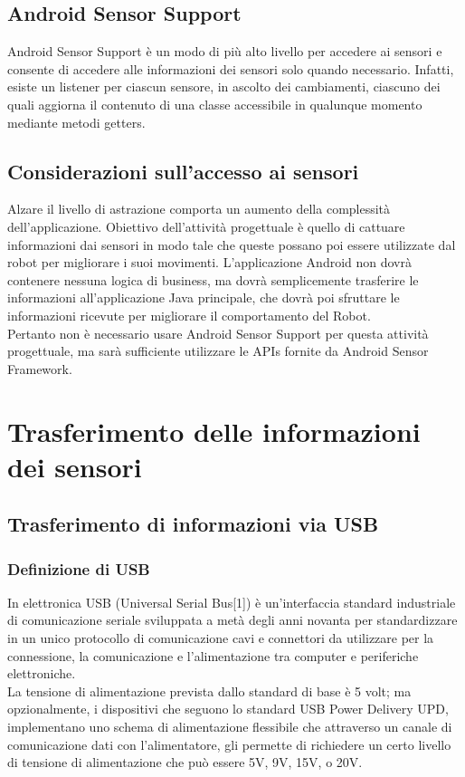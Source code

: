 \documentclass{article}
\begin{document}
\subsection{Android Sensor Support}
Android Sensor Support è un modo di più alto livello per accedere ai sensori e consente di accedere alle informazioni dei sensori solo quando necessario. Infatti, esiste un listener per ciascun sensore, in ascolto dei cambiamenti, ciascuno dei quali aggiorna il contenuto di una classe accessibile in qualunque momento mediante metodi getters. 
\subsection{Considerazioni sull'accesso ai sensori}
Alzare il livello di astrazione comporta un aumento della complessità dell'applicazione. Obiettivo dell'attività progettuale è quello di cattuare informazioni dai sensori in modo tale che queste possano poi essere utilizzate dal robot per migliorare i suoi movimenti. L'applicazione Android non dovrà contenere nessuna logica di business, ma dovrà semplicemente trasferire le informazioni all'applicazione Java principale, che dovrà poi sfruttare le informazioni ricevute per migliorare il comportamento del Robot. \\
Pertanto non è necessario usare Android Sensor Support per questa attività progettuale, ma sarà sufficiente utilizzare le APIs fornite da Android Sensor Framework.
\newpage
\section{Trasferimento delle informazioni dei sensori}
\subsection{Trasferimento di informazioni via USB}
\subsubsection{Definizione di USB}
In elettronica USB (Universal Serial Bus[1]) è un'interfaccia standard industriale di comunicazione seriale sviluppata a metà degli anni novanta per standardizzare in un unico protocollo di comunicazione cavi e connettori da utilizzare per la connessione, la comunicazione e l'alimentazione tra computer e periferiche elettroniche.\\
La tensione di alimentazione prevista dallo standard di base è 5 volt; ma opzionalmente, i dispositivi che seguono lo standard USB Power Delivery UPD, implementano uno schema di alimentazione flessibile che attraverso un canale di comunicazione dati con l'alimentatore, gli permette di richiedere un certo livello di tensione di alimentazione che può essere 5V, 9V, 15V, o 20V.
\end{document}
